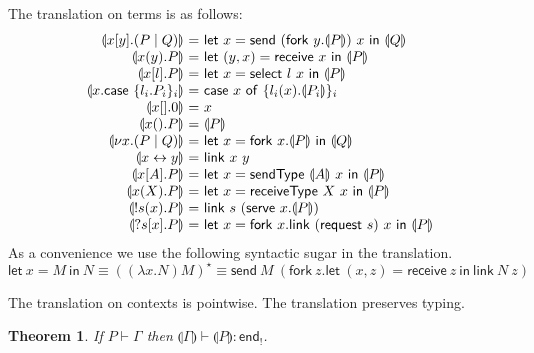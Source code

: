 \documentclass{easychair}
\makeatletter
\newtheorem{theorem}{Theorem}
\newcommand{\ba}{\begin{array}}
\newcommand{\ea}{\end{array}}
\newenvironment{equations}{\[\ba{@{}r@{~}c@{~}l@{}}}{\ea\]}
\newenvironment{eqs}{\ba{@{}r@{~}c@{~}l@{}}}{\ea}
\newcommand{\key}{\mathsf}
\newcommand{\set}[1]{\{ #1 \}}
\newcommand{\cptogv}[1]{\llparenthesis{#1}\rrparenthesis}
\newcommand{\row}[2]{\set{#1}_{#2}}
\newcommand{\gvEndOutput}{\key{end}_!}
\newcommand{\cpj}[2]{{#1} \vdash {#2}}
\newcommand{\gvj}[3]{{#1} \vdash {#2} : {#3}}
\newcommand{\la}{l}
\newcommand{\G}{\Gamma}
\newcommand{\gvLink}[2]{\key{link}~{#1}~{#2}}
\newcommand{\gvLam}[2]{\lambda {#1}.{#2}}
\newcommand{\gvApp}[2]{{#1}~{#2}}
\newcommand{\gvPair}[2]{({#1},{#2})}
\newcommand{\gvLet}[3]{\key{let}~{#1}={#2}~\key{in}~{#3}}
\newcommand{\gvSend}[2]{\key{send}~{#1}~{#2}}
\newcommand{\gvReceive}[1]{\key{receive}~{#1}}
\newcommand{\gvSelect}[2]{\key{select}~{#1}~{#2}}
\newcommand{\gvCase}[2]{\key{case}~{#1}~\key{of}~{#2}}
\newcommand{\gvFork}[2]{\key{fork}~{#1}.{#2}}
\newcommand{\gvTerminate}[1]{\key{terminate}~{#1}}
\newcommand{\gvReceiveK}[4]{\gvLet{\gvPair{#1}{#2}}{\gvReceive{#3}}{#4}}
\newcommand{\gvSendType}[2]{\key{sendType}~{#1}~{#2}}
\newcommand{\gvReceiveType}[2]{\key{receiveType}~{#1}~{#2}}
\newcommand{\gvServe}[2]{\key{serve}~{#1}.{#2}}
\newcommand{\gvRequest}[1]{\key{request}~{#1}}
\newcommand{\cpLink}[2]{{#1} \leftrightarrow {#2}}
\newcommand{\cpCut}[3]{\nu {#1}.({#2} \mid {#3})}
\newcommand{\cpOutput}[4]{{#1}[{#2}].({#3} \mid {#4})}
\newcommand{\cpInput}[3]{{#1}({#2}).{#3}}
\newcommand{\cpInject}[3]{{#1}[{#2}].{#3}}
\newcommand{\cpCase}[2]{{#1}.\key{case}~{#2}}
\newcommand{\cpServe}[3]{!{#1}({#2}).{#3}}
\newcommand{\cpRequest}[3]{?{#1}[{#2}].{#3}}
\newcommand{\cpEmptyOut}[1]{{#1}[].0}
\newcommand{\cpEmptyIn}[2]{{#1}().{#2}}
\newcommand{\cpSendType}[3]{{#1}[{#2}].{#3}}
\newcommand{\cpReceiveType}[3]{{#1}({#2}).{#3}}
\newcommand{\lampi}[1]{({#1})^\star}
\makeatother
\begin{document}
The translation on terms is as follows:
\[
\begin{eqs}
\cptogv{\cpOutput{x}{y}{P}{Q}} &=&
  \gvLet{x}{\gvSend{(\gvFork{y}{\cptogv{P}})}{x}}{\cptogv{Q}} \\
\cptogv{\cpInput{x}{y}{P}} &=&
  \gvLet{\gvPair{y}{x}}{\gvReceive{x}}{\cptogv{P}} \\
\cptogv{\cpInject{x}{\la}{P}} &=&
  \gvLet{x}{\gvSelect{\la}{x}}{\cptogv{P}} \\
\cptogv{\cpCase{x}{\row{\la_i.P_i}{i}}} &=&
  \gvCase{x}{\row{\la_i(x).\cptogv{P_i}}{i}} \\
\cptogv{\cpEmptyOut{x}} &=& x \\
\cptogv{\cpEmptyIn{x}{P}} &=& \cptogv{P} \\
\cptogv{\cpCut{x}{P}{Q}} &=&
  \gvLet{x}{\gvFork{x}{\cptogv{P}}}{\cptogv{Q}} \\
\cptogv{\cpLink{x}{y}} &=& \gvLink{x}{y} \\

\cptogv{\cpSendType{x}{A}{P}} &=&
  \gvLet{x}{\gvSendType{\cptogv{A}}{x}}{\cptogv{P}} \\
\cptogv{\cpReceiveType{x}{X}{P}} &=&
  \gvLet{x}{\gvReceiveType{X}{x}}{\cptogv{P}} \\

\cptogv{\cpServe{s}{x}{P}} &=&
  \gvLink{s}{(\gvServe{x}{\cptogv{P}})} \\
\cptogv{\cpRequest{s}{x}{P}} &=&
  \gvLet{x}{\gvFork{x}{\gvLink{(\gvRequest{s})}{x}}}{\cptogv{P}} \\
\end{eqs}
\]
%
As a convenience we use the following syntactic sugar in the translation.
\[
\gvLet{x}{M}{N} \equiv \lampi{(\lambda x.N) M} \equiv \gvSend{M}{(\gvFork{z}{\gvReceiveK{x}{z}{z}{\gvLink{N}{z}}})}
\]


%
%
The translation on contexts is pointwise.
The translation preserves typing.
\begin{theorem}
If $\cpj{P}{\G}$ then $\gvj{\cptogv{\G}}{\cptogv{P}}{\gvEndOutput}$.
\end{theorem}
\end{document}
